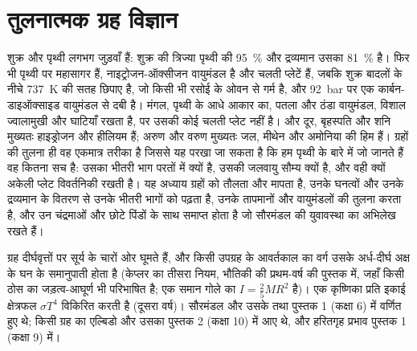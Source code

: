 \chapter{तुलनात्मक ग्रह विज्ञान}\label{ch:b1:comparative-planetology}

शुक्र और पृथ्वी लगभग जुड़वाँ हैं: शुक्र की त्रिज्या पृथ्वी की \qty{95}{\percent} और द्रव्यमान उसका
\qty{81}{\percent} है। फिर भी पृथ्वी पर महासागर हैं, नाइट्रोजन-ऑक्सीजन वायुमंडल है और चलती प्लेटें हैं,
जबकि शुक्र बादलों के नीचे \qty{737}{K} की सतह छिपाए है, जो किसी भी रसोई के ओवन से गर्म है, और
\qty{92}{bar} पर एक कार्बन-डाइऑक्साइड वायुमंडल से दबी है। मंगल, पृथ्वी के आधे आकार का, पतला और
ठंडा वायुमंडल, विशाल ज्वालामुखी और घाटियाँ रखता है, पर उसकी कोई चलती प्लेट नहीं है। और दूर,
बृहस्पति और शनि मुख्यतः हाइड्रोजन और हीलियम हैं; अरुण और वरुण मुख्यतः जल, मीथेन और अमोनिया की
हिम हैं। ग्रहों की तुलना ही वह एकमात्र तरीका है जिससे यह परखा जा सकता है कि हम पृथ्वी के बारे में
जो जानते हैं वह कितना सच है: उसका भीतरी भाग परतों में क्यों है, उसकी जलवायु सौम्य क्यों है, और
वही क्यों अकेली प्लेट विवर्तनिकी रखती है। यह अध्याय ग्रहों को तौलता और मापता है, उनके घनत्वों और
उनके द्रव्यमान के वितरण से उनके भीतरी भागों को पढ़ता है, उनके तापमानों और वायुमंडलों की तुलना करता
है, और उन चंद्रमाओं और छोटे पिंडों के साथ समाप्त होता है जो सौरमंडल की युवावस्था का अभिलेख रखते हैं।

\begin{recall}
ग्रह दीर्घवृत्तों पर सूर्य के चारों ओर घूमते हैं, और किसी उपग्रह के आवर्तकाल का वर्ग उसके
अर्ध-दीर्घ अक्ष के घन के समानुपाती होता है (केप्लर का तीसरा नियम, भौतिकी की प्रथम-वर्ष की पुस्तक
में, जहाँ किसी ठोस का जड़त्व-आघूर्ण भी परिभाषित है; एक समान गोले का $I = \tfrac25MR^2$ है)। एक
कृष्णिका प्रति इकाई क्षेत्रफल $\sigma T^4$ विकिरित करती है (दूसरा वर्ष)। सौरमंडल और उसके 
तथा  पुस्तक 1 (कक्षा 6) में वर्णित हुए थे; किसी ग्रह का एल्बिडो और उसका 
पुस्तक 2 (कक्षा 10) में आए थे, और हरितगृह प्रभाव पुस्तक 1 (कक्षा 9) में।
\end{recall}

